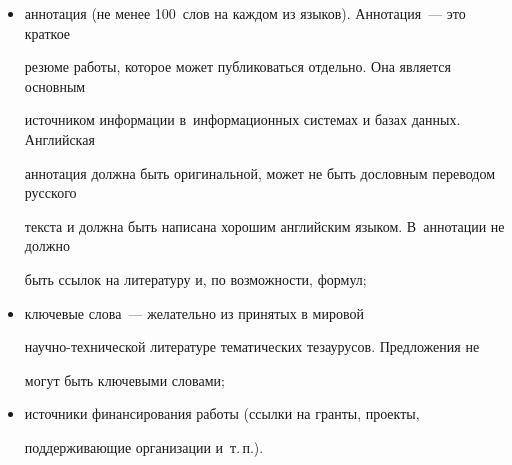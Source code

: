 {\begin{enumerate}[1.]
\begin{itemize}
{}%


 \def\rightfootline{\small{ИНФОРМАТИКА И ЕЁ ПРИМЕНЕНИЯ\ \ \ том\ 18\ \ \ выпуск\ 3\ \ \ 2024


\hfill \textbf{\thepage}}}











{\sf http://www.ipiran.ru/journal/issues/2013\_07\_01/authors.asp} и





{\sf http://www.ipiran.ru/journal/issues/2013\_07\_01\_eng/authors.asp};


\item аннотация (не менее 100~слов на каждом из языков). Аннотация~--- это краткое


резюме работы, которое может публиковаться отдельно. Она является основным


источником информации в~ин\-фор\-ма\-ци\-он\-ных системах и базах данных. Английская


аннотация должна быть оригинальной, может не быть дословным переводом русского


текста и должна быть написана хорошим английским языком. В~аннотации не должно


быть ссылок на литературу и, по возможности, формул;\\[-15pt]


\item ключевые слова~--- желательно из принятых в мировой


на\-уч\-но-тех\-ни\-че\-ской литературе тематических тезаурусов. Предложения не


могут быть ключевыми словами;\\[-15pt]


\item источники финансирования работы (ссылки на гранты, проекты,


поддерживающие организации и~т.\,п.).


\end{itemize}

















\end{enumerate}}
